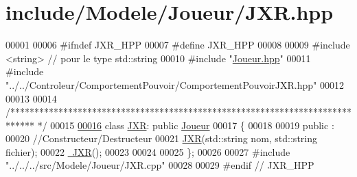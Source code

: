 \hypertarget{_j_x_r_8hpp_source}{\section{include/\-Modele/\-Joueur/\-J\-X\-R.hpp}
}

\begin{DoxyCode}
00001 
00006 \textcolor{preprocessor}{#ifndef JXR\_HPP}
00007 \textcolor{preprocessor}{}\textcolor{preprocessor}{#define JXR\_HPP}
00008 \textcolor{preprocessor}{}
00009 \textcolor{preprocessor}{#include <string>} \textcolor{comment}{// pour le type std::string}
00010 \textcolor{preprocessor}{#include "\hyperlink{_joueur_8hpp}{Joueur.hpp}"}
00011 \textcolor{preprocessor}{#include "../../Controleur/ComportementPouvoir/ComportementPouvoirJXR.hpp"}
00012 
00013 
00014 \textcolor{comment}{/*****************************************************************************
      */}
00015 
\hypertarget{_j_x_r_8hpp_source_l00016}{}\hyperlink{class_j_x_r}{00016} \textcolor{keyword}{class }\hyperlink{class_j_x_r}{JXR}: \textcolor{keyword}{public} \hyperlink{class_joueur}{Joueur}
00017 \{   
00018 
00019    \textcolor{keyword}{public} :
00020       \textcolor{comment}{//Constructeur/Destructeur}
00021       \hyperlink{class_j_x_r_aae0980eb175a7241780f7b356bfc225f}{JXR}(std::string nom, std::string fichier);
00022       \hyperlink{class_j_x_r_ab45417fe9d5e2460b6fdfd650692c2e1}{~JXR}();
00023    
00024   
00025 \};
00026 
00027 \textcolor{preprocessor}{#include "../../../src/Modele/Joueur/JXR.cpp"}
00028 
00029 \textcolor{preprocessor}{#endif // JXR\_HPP}
\end{DoxyCode}
